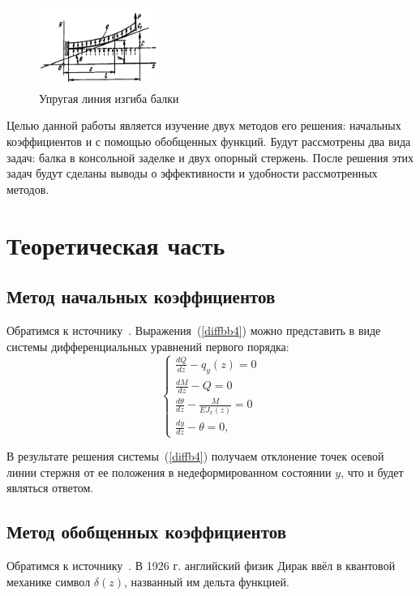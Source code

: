 \documentclass[12pt, a4paper]{article}
\begin{document}
\begin{figure}[!h]
	\centering
	\includegraphics[width=0.35\textwidth]{pic.6}%
	\caption{Упругая линия изгиба балки}
	\vspace*{-2mm}
	\label{pic6}
\end{figure}
\newpage
Целью данной работы является изучение двух методов его решения: начальных коэффициентов и с помощью обобщенных функций. Будут рассмотрены два вида задач: балка в консольной заделке и двух опорный стержень. После решения этих задач будут сделаны выводы о эффективности и удобности рассмотренных методов.

\section{Теоретическая часть}

\subsection{Метод начальных коэффициентов}
Обратимся к источнику~\cite{Feofociev}.
Выражения~(\ref{diffbb4}) можно представить в виде системы дифференциальных уравнений первого порядка:
\begin{equation}
	\label{diffb4}
	\begin{cases}
		\frac{d Q}{d z} - q_{y}(z) = 0\\
		\frac {d M}{d z} - Q = 0\\
		\frac{d \theta}{d z} - \frac{M}{E J_{x}(z)} = 0\\
		\frac{d y}{d z} - \theta = 0, 
	\end{cases}
\end{equation}

В результате решения системы~(\ref{diffb4}) получаем отклонение точек осевой линии стержня от ее положения в недеформированном состоянии $y$, что и будет являться ответом.

\subsection{Метод обобщенных коэффициентов}
Обратимся к источнику~\cite{Korneev}.
В 1926 г. английский физик Дирак ввёл в квантовой механике символ $\delta (z)$, названный им дельта функцией.
\end{document}
